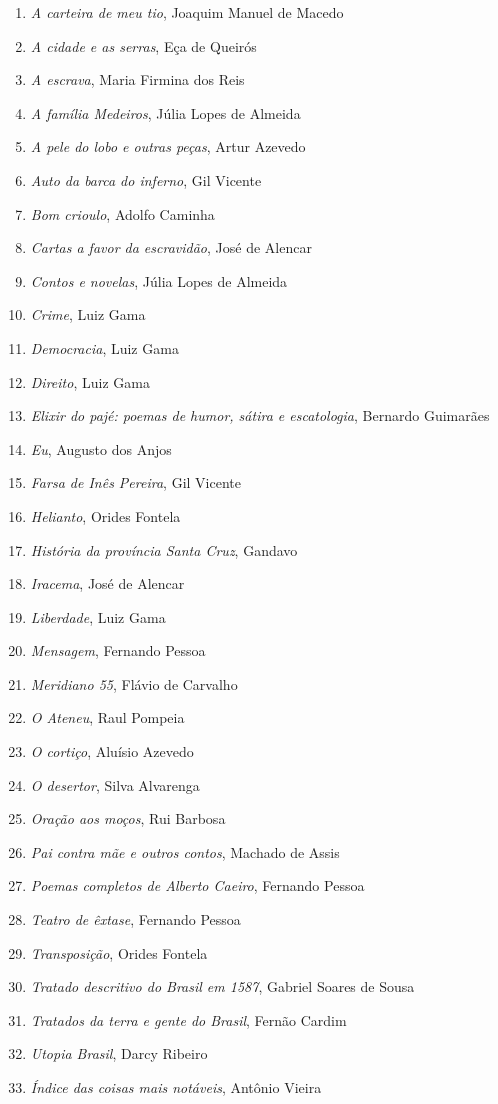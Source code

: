 \begin{enumerate}
\setlength{\topsep}{2pt}
\setlength{\partopsep}{0pt}
\setlength\parskip{4.2pt}
\setlength\itemsep{-1.4mm}
\item \textit{A carteira de meu tio}, Joaquim Manuel de Macedo
\item \textit{A cidade e as serras}, Eça de Queirós
\item \textit{A escrava}, Maria Firmina dos Reis
\item \textit{A família Medeiros}, Júlia Lopes de Almeida 
\item \textit{A pele do lobo e outras peças}, Artur Azevedo
\item \textit{Auto da barca do inferno}, Gil Vicente
\item \textit{Bom crioulo}, Adolfo Caminha
\item \textit{Cartas a favor da escravidão}, José de Alencar
\item \textit{Contos e novelas}, Júlia Lopes de Almeida
\item \textit{Crime}, Luiz Gama
\item \textit{Democracia}, Luiz Gama
\item \textit{Direito}, Luiz Gama
\item \textit{Elixir do pajé: poemas de humor, sátira e escatologia}, Bernardo Guimarães
\item \textit{Eu}, Augusto dos Anjos
\item \textit{Farsa de Inês Pereira}, Gil Vicente
\item \textit{Helianto}, Orides Fontela
\item \textit{História da província Santa Cruz}, Gandavo
\item \textit{Iracema}, José de Alencar
\item \textit{Liberdade}, Luiz Gama
\item \textit{Mensagem}, Fernando Pessoa
\item \textit{Meridiano 55}, Flávio de Carvalho
\item \textit{O Ateneu}, Raul Pompeia
\item \textit{O cortiço}, Aluísio Azevedo
\item \textit{O desertor}, Silva Alvarenga
\item \textit{Oração aos moços}, Rui Barbosa
\item \textit{Pai contra mãe e outros contos}, Machado de Assis
\item \textit{Poemas completos de Alberto Caeiro}, Fernando Pessoa
\item \textit{Teatro de êxtase}, Fernando Pessoa
\item \textit{Transposição}, Orides Fontela
\item \textit{Tratado descritivo do Brasil em 1587}, Gabriel Soares de Sousa
\item \textit{Tratados da terra e gente do Brasil}, Fernão Cardim 
\item \textit{Utopia Brasil}, Darcy Ribeiro
\item \textit{Índice das coisas mais notáveis}, Antônio Vieira
\end{enumerate}

